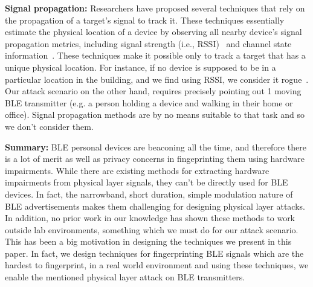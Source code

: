     \begin{comment}
    However, the underlying problem of devices continuously transmitting Bluetooth
    advertisements, does lead to another adversarial attack surface -- analyzing
    the wireless signal properties of these transmissions. 
    RF properties that particularly identify specific transmitter hardware
    imperfections, can be used to derive a device signature, that can be used by an
    adversary to potentially track target users.
    The scary part -- such device fingeprints are unique to the transmitter
    hardware, and as long as devices continue transmitting, no software/firmware
    patch can resolve this tracking vulnerability.\noteby{NB}{Better phrasing}
    \end{comment}
    
    \noindent\textbf{Signal propagation:} Researchers have proposed several
    techniques that rely on the propagation of a target's signal to track it.
    These techniques essentially estimate the physical location of a device by
    observing all nearby device's signal propagation metrics, including signal
    strength (i.e., RSSI)~\cite{rssi1,rssi4,rssi3} and
    channel state information~\cite{csi2,csi3}. These techniques make it possible only
    to track a target that has a unique physical location. For instance,
    if no device is supposed to be in a particular location in the building, and we find using RSSI, we consider it rogue~\cite{rssi1}.
    Our attack scenario on the other hand, requires precisely pointing out 1 moving BLE transmitter (e.g. a person holding a device and walking in their home or office). Signal propagation methods are by no means suitable to that task and so we don't consider them.
    
    \noindent\textbf{Summary:} BLE personal devices are beaconing all the time, and therefore there is a lot of merit as well as privacy concerns in fingeprinting them using hardware impairments. While there are existing methods for extracting hardware impairments from physical layer signals, they can't be directly used for BLE devices. In fact, the narrowband, short duration, simple modulation nature of BLE advertisements makes them challenging for designing physical layer attacks. In addition, no prior work in our knowledge has shown these methods to work outside lab environments, something which we must do for our attack scenario. This has been a big motivation in designing the techniques we present in this paper. In fact, we design techniques for fingerprinting BLE signals which are the hardest to fingerprint, in a real world environment and using these techniques, we enable the mentioned physical layer attack on BLE transmitters.
    
